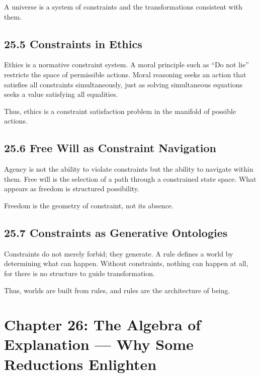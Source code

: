 \documentclass[12pt,letterpaper]{article}
\theoremstyle{remark}
\begin{document}
A universe is a system of constraints and the transformations consistent with them.

\subsection{25.5 Constraints in Ethics}

Ethics is a normative constraint system. A moral principle such as ``Do not lie'' restricts the space of permissible actions. Moral reasoning seeks an action that satisfies all constraints simultaneously, just as solving simultaneous equations seeks a value satisfying all equalities.

Thus, ethics is a constraint satisfaction problem in the manifold of possible actions.

\subsection{25.6 Free Will as Constraint Navigation}

Agency is not the ability to violate constraints but the ability to navigate within them. Free will is the selection of a path through a constrained state space. What appears as freedom is structured possibility.

Freedom is the geometry of constraint, not its absence.

\subsection{25.7 Constraints as Generative Ontologies}

Constraints do not merely forbid; they generate. A rule defines a world by determining what can happen. Without constraints, nothing can happen at all, for there is no structure to guide transformation.

Thus, worlds are built from rules, and rules are the architecture of being.

\newpage

\section{Chapter 26: The Algebra of Explanation — Why Some Reductions Enlighten}
\end{document}
